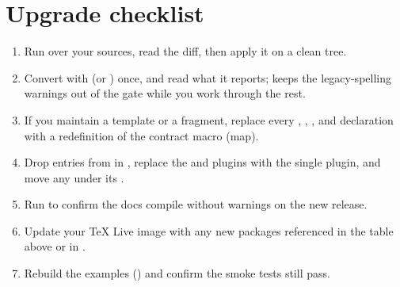 \documentclass[a4paper,twoside]{article}
\begin{document}
\section{Upgrade checklist}
\begin{enumerate}
\item Run  over your sources, read the diff, then apply
it on a clean tree.
\item Convert with  (or ) once, and read
what it reports;  keeps the legacy-spelling warnings out
of the gate while you work through the rest.
\item If you maintain a template or a fragment, replace every ,
, ,  and  declaration with a
redefinition of the contract macro
(map).
\item Drop  entries from  in ,
replace the  and  plugins with the single
 plugin, and move any  under its .
\item Run  to confirm the docs compile without warnings on
the new release.
\item Update your \TeX{} Live image with any new packages referenced in the table
above or in .
\item Rebuild the examples () and confirm the smoke tests
still pass.
\end{enumerate}
\end{document}
